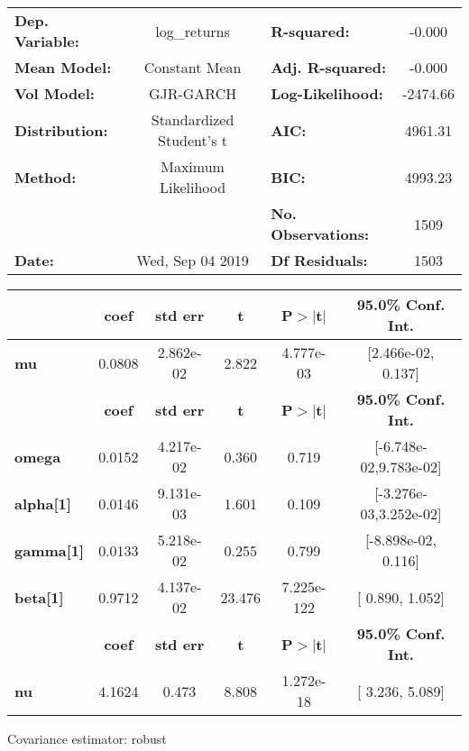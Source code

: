 \begin{center}
\begin{tabular}{lclc}
\toprule
\textbf{Dep. Variable:} &       log\_returns       & \textbf{  R-squared:         } &    -0.000   \\
\textbf{Mean Model:}    &      Constant Mean       & \textbf{  Adj. R-squared:    } &    -0.000   \\
\textbf{Vol Model:}     &        GJR-GARCH         & \textbf{  Log-Likelihood:    } &   -2474.66  \\
\textbf{Distribution:}  & Standardized Student's t & \textbf{  AIC:               } &    4961.31  \\
\textbf{Method:}        &    Maximum Likelihood    & \textbf{  BIC:               } &    4993.23  \\
\textbf{}               &                          & \textbf{  No. Observations:  } &    1509     \\
\textbf{Date:}          &     Wed, Sep 04 2019     & \textbf{  Df Residuals:      } &    1503     \\
\bottomrule
\end{tabular}
\begin{tabular}{lccccc}
            & \textbf{coef} & \textbf{std err} & \textbf{t} & \textbf{P$> |$t$|$} & \textbf{95.0\% Conf. Int.}  \\
\midrule
\textbf{mu} &       0.0808  &    2.862e-02     &     2.822  &      4.777e-03       &    [2.466e-02,  0.137]      \\
                  & \textbf{coef} & \textbf{std err} & \textbf{t} & \textbf{P$> |$t$|$} & \textbf{95.0\% Conf. Int.}  \\
\midrule
\textbf{omega}    &       0.0152  &    4.217e-02     &     0.360  &          0.719       &   [-6.748e-02,9.783e-02]    \\
\textbf{alpha[1]} &       0.0146  &    9.131e-03     &     1.601  &          0.109       &   [-3.276e-03,3.252e-02]    \\
\textbf{gamma[1]} &       0.0133  &    5.218e-02     &     0.255  &          0.799       &    [-8.898e-02,  0.116]     \\
\textbf{beta[1]}  &       0.9712  &    4.137e-02     &    23.476  &      7.225e-122      &     [  0.890,  1.052]       \\
            & \textbf{coef} & \textbf{std err} & \textbf{t} & \textbf{P$> |$t$|$} & \textbf{95.0\% Conf. Int.}  \\
\midrule
\textbf{nu} &       4.1624  &        0.473     &     8.808  &      1.272e-18       &     [  3.236,  5.089]       \\
\bottomrule
\end{tabular}
\end{center}

Covariance estimator: robust
